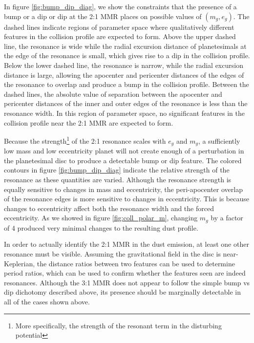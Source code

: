 \documentclass[fleqn,usenatbib]{mnras}
\begin{document}
In figure \ref{fig:bump_dip_diag}, we show the constraints that the presence of a bump or a dip or dip at the 2:1 MMR places on possible values of $(m_{g}, e_{g})$. The dashed
lines indicate regions of parameter space where qualitatively different features in the collision profile are expected to form. Above the upper dashed line, the 
resonance is wide while the radial excursion distance of planetesimals at the edge of the resonance is small, which gives rise to a dip in the collision profile. 
Below the lower dashed line, the resonance is narrow, while the radial excursion distance is large, allowing the apocenter and pericenter distances of the edges 
of the resonance to overlap and produce a bump in the collision profile. Between the dashed lines, the absolute value of separation between the apocenter and 
pericenter distances of the inner and outer edges of the resonance is less than the resonance width. In this region of parameter space, no significant features in 
the collision profile near the 2:1 MMR are expected to form. 

Because the strength\footnote{More specifically, the strength of the resonant term in the disturbing potential} of the 2:1 resonance scales with $e_{g}$ and  $m_{g}$, a sufficiently low 
mass and low eccentricity planet will not create enough of a perturbation in the planetesimal disc to produce a detectable bump or dip feature. The colored contours in figure 
\ref{fig:bump_dip_diag} indicate the relative strength of the resonance as these quantities are varied. Although the resonance strength is equally sensitive to changes in mass and 
eccentricity, the peri-apocenter overlap of the resonance edges is more sensitive to changes in eccentricity. This is because changes to eccentricity affect both the resonance width and 
the forced eccentricity. As we showed in figure \ref{fig:coll_polar_m}, changing $m_{g}$ by a factor of 4 produced very minimal changes to the resulting dust profile.

In order to actually identify the 2:1 MMR in the dust emission, at least one other resonance must be visible. Assuming the gravitational field in the 
disc is near-Keplerian, the distance ratios between two features can be used to determine period ratios, which can be used to confirm whether the 
features seen are indeed resonances. Although the 3:1 MMR does not appear to follow the simple bump vs dip dichotomy described above, its 
presence should be marginally detectable in all of the cases shown above.
\end{document}
